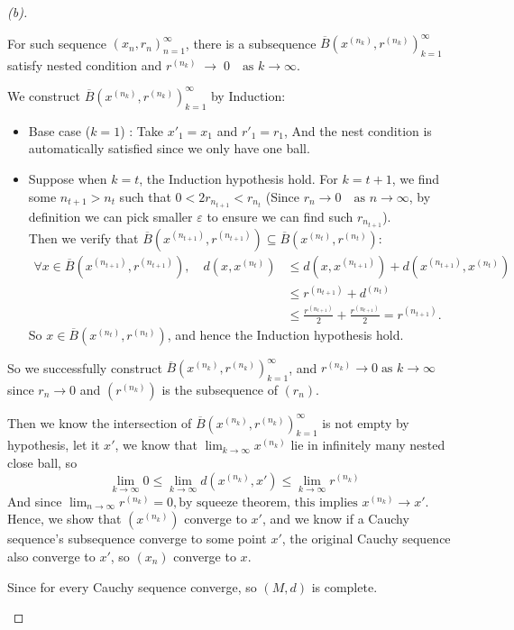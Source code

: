 \begin{proof}[(b)]
\begin{itemize}
        \begin{claim}
            For such sequence $(x_n, r_n)_{n=1}^\infty$, there is a subsequence
            $\overline{B}(x^{(n_k)},r^{(n_k)})_{k=1}^{\infty}$ satisfy nested condition and $r^{(n_k)} \;\to\; 0 \quad\text{as } k\to\infty$.
        \end{claim}
        \begin{explanation}
            We construct $\overline{B}(x^{(n_k)},r^{(n_k)})_{k=1}^{\infty}$ by Induction:
            \begin{itemize}
                \item Base case ($k=1$) : Take $x'_1 = x_1$ and $r'_1 = r_1$, And the nest condition is automatically satisfied since we only have one ball.
                \item Suppose when $k = t$, the Induction hypothesis hold. For $k = t+1$, we find some $n_{t+1} > n_{t}$ such that $0 < 2r_{n_{t+1}} < r_{n_{t}}$ (Since $r_n \to 0 \quad\text{as } n\to\infty$, by definition we can pick smaller $\varepsilon$ to ensure we can find such $r_{n_{t+1}}$). \\
                Then we verify that $\overline{B}(x^{(n_{t+1})},r^{(n_{t+1})}) \subseteq \overline{B}(x^{(n_{t})},r^{(n_{t})})$:
                \begin{align*}
                \forall x \in \overline{B}(x^{(n_{t+1})},r^{(n_{t+1})}), \quad 
                d(x, x^{(n_{t})}) 
                &\leq d(x, x^{(n_{t+1})}) + d(x^{(n_{t+1})}, x^{(n_{t})}) \\
                &\leq r^{(n_{t+1})} + d^{(n_{t})} \\
                &\leq \frac{r^{(n_{t+1})}}{2} + \frac{r^{(n_{t+1})}}{2} = r^{(n_{t+1})}.
                \end{align*}
                So $x \in \overline{B}(x^{(n_{t})},r^{(n_{t})})$, and hence the Induction hypothesis hold.
            \end{itemize}
            So we successfully construct $\overline{B}(x^{(n_k)},r^{(n_k)})_{k=1}^{\infty}$, and $r^{(n_k)} \to 0 \;\text{as } k\to\infty$ since $r_n \to 0$ and $(r^{(n_k)})$ is the subsequence of $(r_n)$.
        \end{explanation}
        Then we know the intersection of $\overline{B}(x^{(n_k)},r^{(n_k)})_{k=1}^{\infty}$ is not empty by hypothesis, let it $x'$, we know that $\lim_{k \to \infty} x^{(n_k)}$ lie in infinitely many nested close ball, so 
        \[
        \lim_{k \to \infty}0 \leq \lim_{k \to \infty} d(x^{(n_k)}, x') \leq \lim_{k \to \infty}r^{(n_k)} 
        \]
         And since $\lim_{n \to \infty} r^{(n_k)} = 0,\text{by squeeze theorem, this implies } x^{(n_k)} \to x'$.
        Hence, we show that $(x^{(n_k)})$ converge to $x'$, and we know if a Cauchy sequence's subsequence converge to some point $x'$, the original Cauchy sequence also converge to $x'$, so $(x_n)$ converge to $x$.
        
        Since for every Cauchy sequence converge, so $(M,d)$ is complete.
        
    \end{itemize}
\end{proof}